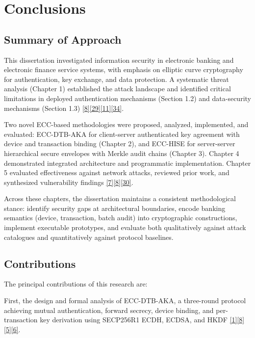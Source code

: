 \chapter*{Conclusions}
\label{ch:conclusions}

\section{Summary of Approach}

\indent This dissertation investigated information security in electronic banking and electronic finance service systems, with emphasis on elliptic curve cryptography for authentication, key exchange, and data protection. A systematic threat analysis (Chapter 1) established the attack landscape and identified critical limitations in deployed authentication mechanisms (Section 1.2) and data-security mechanisms (Section 1.3) \hyperref[ref:8]{[8]}\hyperref[ref:29]{[29]}\hyperref[ref:11]{[11]}\hyperref[ref:34]{[34]}.

\indent Two novel ECC-based methodologies were proposed, analyzed, implemented, and evaluated: ECC-DTB-AKA for client-server authenticated key agreement with device and transaction binding (Chapter 2), and ECC-HISE for server-server hierarchical secure envelopes with Merkle audit chains (Chapter 3). Chapter 4 demonstrated integrated architecture and programmatic implementation. Chapter 5 evaluated effectiveness against network attacks, reviewed prior work, and synthesized vulnerability findings \hyperref[ref:7]{[7]}\hyperref[ref:8]{[8]}\hyperref[ref:30]{[30]}.

\indent Across these chapters, the dissertation maintains a consistent methodological stance: identify security gaps at architectural boundaries, encode banking semantics (device, transaction, batch audit) into cryptographic constructions, implement executable prototypes, and evaluate both qualitatively against attack catalogues and quantitatively against protocol baselines.

\section{Contributions}

\indent The principal contributions of this research are:

\indent First, the design and formal analysis of ECC-DTB-AKA, a three-round protocol achieving mutual authentication, forward secrecy, device binding, and per-transaction key derivation using SECP256R1 ECDH, ECDSA, and HKDF \hyperref[ref:1]{[1]}\hyperref[ref:8]{[8]}\hyperref[ref:5]{[5]}\hyperref[ref:6]{[6]}.

